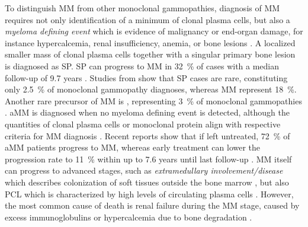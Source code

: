 To distinguish \ac{MM} from other monoclonal gammopathies, diagnosis of \ac{MM}
requires not only identification of a minimum of clonal plasma cells, but also a
\emph{myeloma defining event} which is evidence of malignancy or end-organ
damage, for instance hypercalcemia, renal insufficiency, anemia, or bone lesions
\cite{rajkumarInternationalMyelomaWorking2014}. A localized
smaller mass of clonal plasma
cells together with a singular primary bone lesion is diagnosed as \ac{SP}.
\ac{SP} can progress to \ac{MM} in \SI{32}{\percent} of cases with a median
follow-up of 9.7 years
\cite{thumallapallySolitaryPlasmacytomaPopulationbased2017,
    gaoSolitaryBonePlasmacytoma2024}. Studies from
\citet{kyleMonoclonalGammopathyUndetermined1997} show that \ac{SP} cases are
rare, constituting only \SI{2.5}{\percent} of monoclonal gammopathy diagnoses,
whereas \ac{MM} represent \SI{18}{\percent}. Another rare precursor of \ac{MM}
is  , representing \SI{3}{\percent} of
monoclonal gammopathies \cite{kyleMonoclonalGammopathyUndetermined1997}.
\ac{aMM} is diagnosed when no myeloma defining event is detected, although the
quantities of clonal plasma cells or monoclonal protein align with respective
criteria for \ac{MM} diagnosis \cite{rajkumarInternationalMyelomaWorking2014}.
Recent reports show that if left untreated, \SI{72}{\percent} of \ac{aMM}
patients progress to \ac{MM}, whereas early treatment can lower the progression
rate to \SI{11}{\percent} within up to 7.6 years until last
follow-up
\cite{abdallahModeProgressionSmoldering2024,
    mateosmaria-victoriaLenalidomideDexamethasoneHighRisk2013}. \ac{MM} itself can
progress to advanced stages, such as \emph{extramedullary involvement/disease}
which describes colonization of soft tissues outside the bone marrow
\cite{bladeExtramedullaryDiseaseMultiple2022}, but also \ac{PCL} which is
characterized by high levels of circulating plasma cells
\cite{jungUpdatePrimaryPlasma2022}. However, the most common cause of death is
renal failure during the \ac{MM} stage, caused by excess immunoglobulins or
hypercalcemia due to bone degradation \cite{kunduMultipleMyelomaRenal2022}.

